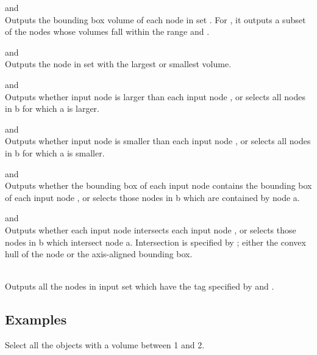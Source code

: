 \begin{description}
	\item{ and } \\
		Outputs the bounding box volume of each node in set . For , it outputs a subset of the nodes whose volumes fall within the range  and .
	\item{ and } \\
		Outputs the node in set  with the largest or smallest volume.
	\item{ and }\\
		Outputs whether input node  is larger than each input node , or selects all nodes in b for which a is larger.
	\item{ and }\\
		Outputs whether input node  is smaller than each input node , or selects all nodes in b for which a is smaller.
	\item{ and } \\
		Outputs whether the bounding box of each input node  contains the bounding box of each input node , or selects those nodes in b which are contained by node a.
	\item{ and } \\
		Outputs whether each input node  intersects each input node , or selects those nodes in b which intersect node a. Intersection is specified by ; either the convex hull of the node or the axis-aligned bounding box.
	\item{} \\
		Outputs all the nodes in input set  which have the tag specified by  and .
\end{description}


\subsection{Examples}

Select all the objects with a volume between 1 and 2.

